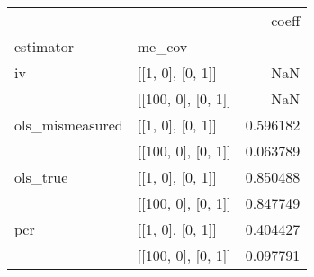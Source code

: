\begin{tabular}{llr}
\toprule
    &                    &     coeff \\
estimator & me\_cov &           \\
\midrule
iv & [[1, 0], [0, 1]] &       NaN \\
    & [[100, 0], [0, 1]] &       NaN \\
ols\_mismeasured & [[1, 0], [0, 1]] &  0.596182 \\
    & [[100, 0], [0, 1]] &  0.063789 \\
ols\_true & [[1, 0], [0, 1]] &  0.850488 \\
    & [[100, 0], [0, 1]] &  0.847749 \\
pcr & [[1, 0], [0, 1]] &  0.404427 \\
    & [[100, 0], [0, 1]] &  0.097791 \\
\bottomrule
\end{tabular}
